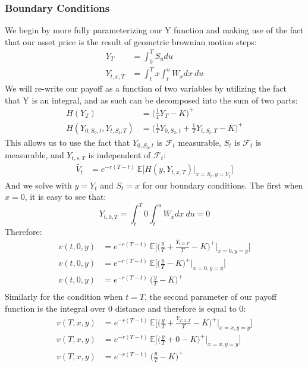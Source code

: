 \documentclass[a4paper,12pt]{article}
\begin{document}
\subsubsection{Boundary Conditions}
We begin by more fully parameterizing our Y function and making use of the fact that our asset price is the result of geometric brownian motion steps:
\begin{align*}
Y_{T} &= \int_0^T S_udu \\
Y_{t, x, T} &= \int_t^T x \int_t^u W_x dx \ du
\end{align*}
We will re-write our payoff as a function of two variables by utilizing the fact that Y is an integral, and as such can be decomposed into the sum of two parts:
\begin{align*}
H(Y_T) &= \bigg( \frac{1}{T}Y_T - K \bigg)^+ \\
H(Y_{0, S_0, t}, Y_{t, S_t, T}) &= \bigg( \frac{1}{T}Y_{0,S_0,t} +  \frac{1}{T}Y_{t, S_t, T} - K \bigg)^+
\end{align*}
This allows us to use the fact that $Y_{0, S_0, t}$ is $\mathcal{F}_t$ measurable, $S_t$ is $\mathcal{F}_t$ is measurable, and $Y_{t, s, T}$ is independent of $\mathcal{F}_t$:
\begin{align*}
\tilde{V_t} &= e^{-r(T-t)} \ \mathbb{E} \big[ H (y, Y_{t, x, T}) | _{x = S_t, y = Y_t} \big]
\end{align*}
And we solve with $y = Y_t$ and $S_t = x$ for our boundary conditions. The first when $x = 0$, it is easy to see that:
$$
Y_{t, 0, T} = \int_t^T 0 \int_t^u W_x dx \ du  = 0
$$
Therefore:
\begin{align*}
v(t, 0, y) &= e^{-r(T-t)} \ \mathbb{E} \big[ \bigg( \frac{y}{T} +  \frac{Y_{t,0,T}}{T} - K \bigg)^+ | _{x = 0, y = y} \big] \\
v(t, 0, y) &= e^{-r(T-t)} \ \mathbb{E} \big[ \bigg( \frac{y}{T} - K \bigg)^+ | _{x = 0, y = y} \big] \\
v(t, 0, y) &= e^{-r(T-t)} \ \bigg( \frac{y}{T} - K \bigg)^+  \\
\end{align*}
Similarly for the condition when $t = T$, the second parameter of our payoff function is the integral over 0 distance and therefore is equal to 0:
\begin{align*}
v(T, x, y) &= e^{-r(T-t)} \ \mathbb{E} \big[ \bigg( \frac{y}{T} +  \frac{Y_{T, x, T}}{T} - K \bigg)^+ | _{x = x, y = y} \big] \\
v(T, x, y) &= e^{-r(T-t)} \ \mathbb{E} \big[ \bigg( \frac{y}{T} +  0  - K \bigg)^+ | _{x = x, y = y} \big] \\
v(T, x, y) &= e^{-r(T-t)} \ \bigg( \frac{y}{T} - K \bigg)^+ \\
\end{align*}
\end{document}
